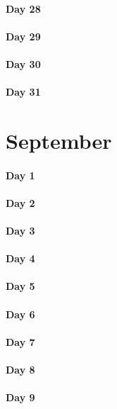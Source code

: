 \documentclass[UTF8,a4paper,8pt]{ctexart}
\begin{document}
 	 \paragraph{Day 28      \quad     }
 	 \paragraph{Day 29      \quad     }   
 	 \paragraph{Day 30      \quad     }
 	 \paragraph{Day 31      \quad     }
\section{September}
 	 \paragraph{Day 1       \quad     }
 	 \paragraph{Day 2       \quad     }
 	 \paragraph{Day 3       \quad     }
 	 \paragraph{Day 4       \quad     }
 	 \paragraph{Day 5       \quad     }
 	 \paragraph{Day 6       \quad     }
 	 \paragraph{Day 7       \quad     }
 	 \paragraph{Day 8       \quad     }
 	 \paragraph{Day 9       \quad     }
\end{document}
